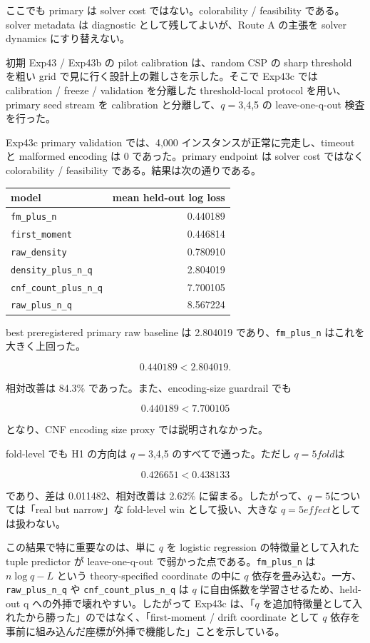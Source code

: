 \documentclass[12pt,a4paper]{article}
\begin{document}
ここでも primary は solver cost ではない。colorability / feasibility である。solver metadata は diagnostic として残してよいが、Route A の主張を solver dynamics にすり替えない。

初期 Exp43 / Exp43b の pilot calibration は、random CSP の sharp threshold を粗い grid で見に行く設計上の難しさを示した。そこで Exp43c では calibration / freeze / validation を分離した threshold-local protocol を用い、primary seed stream を calibration と分離して、\(q=3\),4,5 の leave-one-q-out 検査を行った。

Exp43c primary validation では、4,000 インスタンスが正常に完走し、timeout と malformed encoding は 0 であった。primary endpoint は solver cost ではなく colorability / feasibility である。結果は次の通りである。

{\def\LTcaptype{table} %
\begin{longtable}[]{@{}lr@{}}
\toprule\noalign{}
model & mean held-out log loss \\
\midrule\noalign{}
\endhead
\bottomrule\noalign{}
\endlastfoot
\texttt{fm\_plus\_n} & 0.440189 \\
\texttt{first\_moment} & 0.446814 \\
\texttt{raw\_density} & 0.780910 \\
\texttt{density\_plus\_n\_q} & 2.804019 \\
\texttt{cnf\_count\_plus\_n\_q} & 7.700105 \\
\texttt{raw\_plus\_n\_q} & 8.567224 \\
\end{longtable}
}

best preregistered primary raw baseline は 2.804019 であり、\texttt{fm\_plus\_n} はこれを大きく上回った。

\[
0.440189 < 2.804019.
\]

相対改善は 84.3\% であった。また、encoding-size guardrail でも

\[
0.440189 < 7.700105
\]

となり、CNF encoding size proxy では説明されなかった。

fold-level でも H1 の方向は \(q=3\),4,5 のすべてで通った。ただし \(q=5 fold\)は

\[
0.426651 < 0.438133
\]

であり、差は 0.011482、相対改善は 2.62\% に留まる。したがって、\(q=5\)については「real but narrow」な fold-level win として扱い、大きな \(q=5 effect\)としては扱わない。

この結果で特に重要なのは、単に \(q\) を logistic regression の特徴量として入れた tuple predictor が leave-one-q-out で弱かった点である。\texttt{fm\_plus\_n} は \(n\log q-L\) という theory-specified coordinate の中に \(q\) 依存を畳み込む。一方、\texttt{raw\_plus\_n\_q} や \texttt{cnf\_count\_plus\_n\_q} は \(q\) に自由係数を学習させるため、held-out q への外挿で壊れやすい。したがって Exp43c は、「\(q\) を追加特徴量として入れたから勝った」のではなく、「first-moment / drift coordinate として \(q\) 依存を事前に組み込んだ座標が外挿で機能した」ことを示している。
\end{document}
